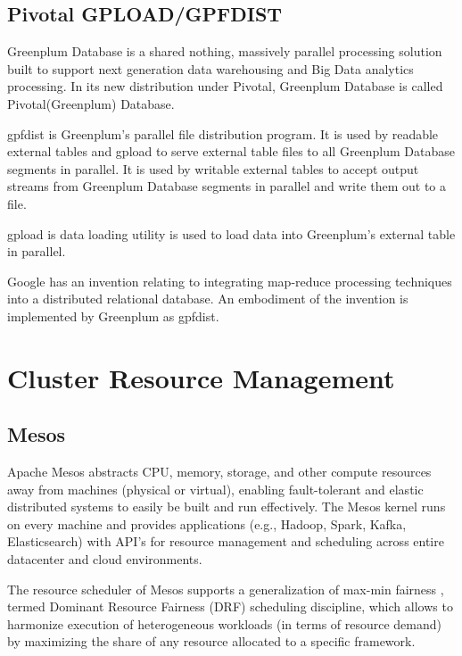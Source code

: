 \subsection{ Pivotal GPLOAD/GPFDIST}

     Greenplum Database \cite{book-greenplum-gollapudi2013} is a
     shared nothing, massively parallel processing solution built to
     support next generation data warehousing and Big Data analytics
     processing. In its new distribution under Pivotal, Greenplum
     Database is called Pivotal(Greenplum) Database.

     gpfdist \cite{www-gpfdist} is Greenplum's parallel file
     distribution program. It is used by readable external tables and
     gpload to serve external table files to all Greenplum Database
     segments in parallel. It is used by writable external tables to
     accept output streams from Greenplum Database segments in
     parallel and write them out to a file.

     gpload \cite{book-greenplum-gollapudi2013} is data loading
     utility is used to load data into Greenplum's external table in
     parallel.

     Google has an invention \cite{patent-google-gpf} relating to
     integrating map-reduce processing techniques into a distributed
     relational database. An embodiment of the invention is
     implemented by Greenplum as gpfdist.

\section{Cluster Resource Management}


\subsection{ Mesos}

     Apache Mesos \cite{www-mesos} abstracts CPU, memory,
     storage, and other compute resources away from machines (physical
     or virtual), enabling fault-tolerant and elastic distributed
     systems to easily be built and run effectively. The Mesos kernel
     runs on every machine and provides applications (e.g., Hadoop,
     Spark, Kafka, Elasticsearch) with API’s for resource management
     and scheduling across entire datacenter and cloud environments.

     The resource scheduler of Mesos supports a generalization of
     max-min fairness \cite{paper-mesos-Abu-Dbai-2016}, termed Dominant
     Resource Fairness (DRF) \cite{paper-mesos-ghodsi2011dominant}
     scheduling discipline, which allows to harmonize execution of
     heterogeneous workloads (in terms of resource demand) by
     maximizing the share of any resource allocated to a specific
     framework.
     
